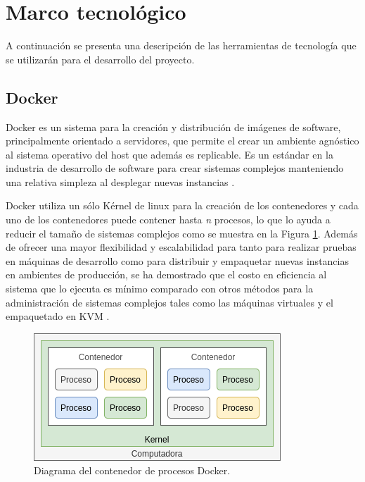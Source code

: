 
\section{Marco tecnológico}

A continuación se presenta una descripción de las herramientas de tecnología que se utilizarán para el desarrollo del proyecto.

\subsection{Docker}

Docker es un sistema para la creación y distribución de imágenes de software, principalmente orientado a servidores, que permite el crear un ambiente agnóstico al sistema operativo del host que además es replicable. Es un estándar en la industria de desarrollo de software para crear sistemas complejos manteniendo una relativa simpleza al desplegar nuevas instancias \cite{rad2017dockerAnalysis}.

Docker utiliza un sólo Kérnel de linux para la creación de los contenedores y cada uno de los contenedores puede contener hasta \textit{n} procesos, lo que lo ayuda a reducir el tamaño de sistemas complejos como se muestra en la Figura \ref{fig:docker_diagrama}. Además de ofrecer una mayor flexibilidad y escalabilidad para tanto para realizar pruebas en máquinas de desarrollo como para distribuir y empaquetar nuevas instancias en ambientes de producción, se ha demostrado que el costo en eficiencia al sistema que lo ejecuta es mínimo comparado con otros métodos para la administración de sistemas complejos tales como las máquinas virtuales y el empaquetado en KVM \cite{rad2017dockerAnalysis, felter2015comparsionPerformance}.

\begin{figure}[!ht]
	\centering
	\includegraphics[width=.45\linewidth]{images/diagrams/docker.drawio.png}
	\caption{Diagrama del contenedor de procesos Docker.}
	\label{fig:docker_diagrama}
\end{figure}

